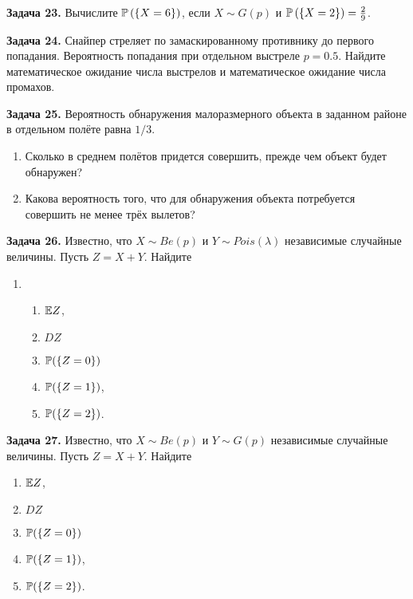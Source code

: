 \textbf{Задача 23.} Вычислите ${\rm {\mathbb P}}\left(\left\{X=6\right\}\right)$, если $X\sim G(p)$ и ${\rm {\mathbb P}}\left(\left\{X=2\right\}\right)={\tfrac{2}{9}} $.

\textbf{Задача 24.} Снайпер стреляет по замаскированному противнику до первого попадания. Вероятность попадания при отдельном выстреле $p=0.5$. Найдите математическое ожидание числа выстрелов и математическое ожидание числа промахов. 

\textbf{Задача 25.} Вероятность обнаружения малоразмерного объекта в заданном районе в отдельном полёте равна $1/3$.

\begin{enumerate}
\item  Сколько в среднем полётов придется совершить, прежде чем объект будет обнаружен?

\item  Какова вероятность того, что для обнаружения объекта потребуется совершить не менее трёх вылетов?
\end{enumerate}

\textbf{Задача 26.} Известно, что $X\sim Be(p)$ и $Y\sim Pois(\lambda )$ независимые случайные величины. Пусть $Z=X+Y$. Найдите

\begin{enumerate}
\item \begin{enumerate}
\item  ${\rm {\mathbb E}}Z$,

\item  $DZ$

\item  ${\rm {\mathbb P}}(\{ Z=0\} )$

\item  ${\rm {\mathbb P}}(\{ Z=1\} )$,

\item  ${\rm {\mathbb P}}(\{ Z=2\} )$.
\end{enumerate}
\end{enumerate}

\textbf{Задача 27.} Известно, что $X\sim Be(p)$ и $Y\sim G(p)$ независимые случайные величины. Пусть $Z=X+Y$. Найдите

\begin{enumerate}
\item  ${\rm {\mathbb E}}Z$,

\item  $DZ$

\item  ${\rm {\mathbb P}}(\{ Z=0\} )$

\item  ${\rm {\mathbb P}}(\{ Z=1\} )$,

\item  ${\rm {\mathbb P}}(\{ Z=2\} )$.
\end{enumerate}

